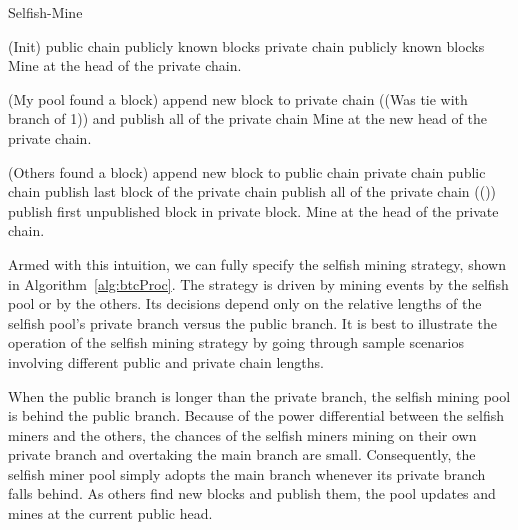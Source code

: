 \documentclass[letterpaper]{llncs}
\begin{document}
\newcommand{\privateBranchLen}{\textit{privateBranchLen}} 
\newcommand{\prevDelta}{\ensuremath{ \Delta_{\textit{prev}} }} 

\begin{algorithm}[t] 
\SetAlgoNoLine 
\SetAlgoNoEnd 
\DontPrintSemicolon 
\caption{Selfish-Mine} 
\label{alg:btcProc} 
\KwOn(Init) { 
    public chain  publicly known blocks \; 
    private chain  publicly known blocks \; 
     \; 
    Mine at the head of the private chain. 
} 
\BlankLine \BlankLine 

\KwOn(My pool found a block) {
     \; 
    append new block to private chain \; 
     \; 
    \If({\hfill(Was tie with branch of 1)}){ and } { 
        publish all of the private chain  
         \; 
    }
    Mine at the new head of the private chain. 
} 
\BlankLine \BlankLine 

\KwOn(Others found a block) { 
     \; 
    append new block to public chain \; 
    \If{} { 
        private chain  public chain  
         \; 
    } \ElseIf{} {
        publish last block of the private chain  
    } \ElseIf{} {
        publish all of the private chain  
         \; 
    } \Else({\hfill()}) { 
        publish first unpublished block in private block. 
    }
    Mine at the head of the private chain. 
} 
\end{algorithm} 

Armed with this intuition, we can fully specify the selfish mining strategy, shown in Algorithm~\ref{alg:btcProc}. The strategy is driven by mining events by 
the selfish pool or by the others. Its decisions depend only on the relative lengths of the selfish pool's private branch versus the public branch.
It is best to illustrate the operation of the selfish mining strategy by going through sample scenarios involving different public and private chain lengths.

When the public branch is longer than the private branch, the selfish mining pool is behind the public branch. Because of the power differential between the selfish miners 
and the others, the chances of the selfish miners mining on their own private branch and overtaking the main branch are small. Consequently, the selfish miner pool simply adopts
the main branch whenever its private branch falls behind. As others find new blocks and publish them, the pool updates and mines at the current public head. 
\end{document}
